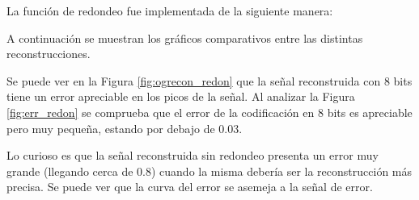 
	La función de redondeo fue implementada de la siguiente manera:
		

	A continuación se muestran los gráficos comparativos entre las distintas reconstrucciones. 

	Se puede ver en la Figura \ref{fig:ogrecon_redon} que la señal reconstruida con 8 bits tiene un error apreciable en los picos de la señal. Al analizar la Figura \ref{fig:err_redon} se comprueba que el error de la codificación en 8 bits es apreciable pero muy pequeña, estando por debajo de \num{.03}.

	Lo curioso es que la señal reconstruida sin redondeo presenta un error muy grande (llegando cerca de \num{.8}) cuando la misma debería ser la reconstrucción más precisa. Se puede ver que la curva del error se asemeja a la señal de error.
